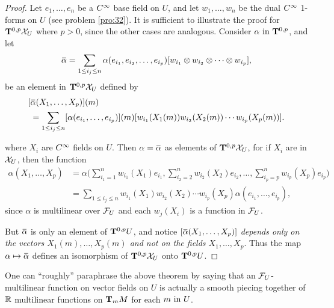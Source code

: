 \documentclass[../main]{subfiles}
\begin{document}
\begin{proof}
Let $e_1,\dots,e_n$ be a $\CInfty$ base field on $U$, and let $w_1,\dots,w_n$ be the dual $\CInfty$ 1-forms on $U$ (see problem \ref{pro:32}). It is sufficient to illustrate the proof for $\tensorbundle{\vectorFields_U}{0}{p}$ where $p>0$, since the other cases are analogous. Consider $\alpha \InText \tensorbundle{}{0}{p}$, and let 
\[ \xoverline\alpha = \sum_{1\le i_j\le n} \alpha(e_{i_1}, e_{i_2},\dots,e_{i_p})[w_{i_1} \otimes w_{i_2} \otimes \cdots \otimes w_{i_p}],\]
be an element in $\tensorbundle{\vectorFields_U}{0}{p}$ defined by
\[ 
\begin{aligned}
[&\xoverline\alpha(X_1,\dots,X_p)](m) \\ 
&= \sum_{1\le i_j\le n} [\alpha(e_{i_1},\dots,e_{i_p})](m)[w_{i_1}(X_1(m)) w_{i_2}(X_2(m))\cdots w_{i_p}(X_p(m))].
\end{aligned}
\] 

where $X_i$ are $\CInfty$ fields on $U$. Then $\alpha =\xoverline\alpha$ as elements of $\tensorbundle{\vectorFields_U}{0}{p}$, for if $X_i$ are in $\vectorFields_U$, then the function
\[
\begin{aligned}
\alpha(X_1,\dots,X_p) &= \alpha\bigg( \sum_{i_1=1}^n w_{i_1}(X_1)e_{i_1}, \sum_{i_2=2}^n w_{i_2}(X_2)e_{i_2}, \dots, \sum_{i_p=p}^n w_{i_p}(X_p)e_{i_p} \bigg)\\
&= \sum_{1\le i_j\le n}w_{i_1}(X_1)w_{i_2}(X_2)\cdots w_{i_p}(X_p)\alpha(e_{i_1},\dots,e_{i_p}),
\end{aligned}
\]
since $\alpha$ is multilinear over $\realFunctions_U$ and each $w_j(X_i)$ is a function in $\realFunctions_U$.

But $\xoverline\alpha$ is only an element of $\tensorbundle{U}{0}{p}$, and notice $[\xoverline\alpha(X_1,\dots,X_p)]$ \emph{depends only on the vectors $X_1(m),\dots,X_p(m)$ and not on the fields $X_1, \dots, X_p$}. Thus the map $\alpha\mapsto\xoverline\alpha$ defines an isomorphism of $\tensorbundle{\vectorFields_U}{0}{p}$ onto $\tensorbundle{U}{0}{p}$. 
\end{proof}



One can ``roughly'' paraphrase the above theorem by saying that an $\realFunctions_U$-multilinear function on vector fields on $U$ is actually a smooth piecing together of $\bR$ multilinear functions on $\tangentspace{M}{m}$ for each $m \InText U$. 
\end{document}

